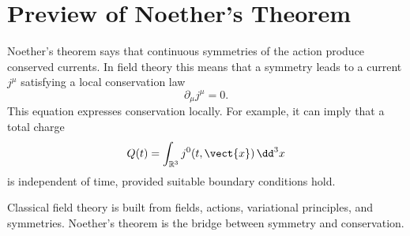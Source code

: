 \section{Preview of Noether's Theorem}

Noether's theorem says that continuous symmetries of the action produce
conserved currents. In field theory this means that a symmetry leads to a
current \(j^\mu\) satisfying a local conservation law
\[
    \partial_\mu j^\mu = 0.
\]
This equation expresses conservation locally. For example, it can imply that a
total charge
\[
    Q(t)=\int_{\mathbb{R}^3} j^0(t,\vect{x})\,\dd^3x
\]
is independent of time, provided suitable boundary conditions hold.

\begin{summarybox}
Classical field theory is built from fields, actions, variational principles,
and symmetries. Noether's theorem is the bridge between symmetry and
conservation.
\end{summarybox}
